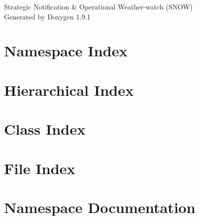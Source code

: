\let\mypdfximage\pdfximage\def\pdfximage{\immediate\mypdfximage}\documentclass[twoside]{book}
\newcommand{\+}{\discretionary{\mbox{\scriptsize$\hookleftarrow$}}{}{}}
\newcommand{\clearemptydoublepage}{%
  \newpage{\pagestyle{empty}\cleardoublepage}%
}
\begin{document}
\raggedbottom

\hypersetup{pageanchor=false,
             bookmarksnumbered=true,
             pdfencoding=unicode
            }
\begin{titlepage}
\vspace*{7cm}
\begin{center}%
{\Large Strategic Notification \& Operational Weather-\/watch (SNOW) }\\
\vspace*{1cm}
{\large Generated by Doxygen 1.9.1}\\
\end{center}
\end{titlepage}
\clearemptydoublepage
{}
\tableofcontents
\clearemptydoublepage
{}
\hypersetup{pageanchor=true}

\chapter{Namespace Index}

\chapter{Hierarchical Index}

\chapter{Class Index}

\chapter{File Index}

\chapter{Namespace Documentation}







\end{document}
